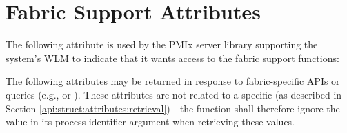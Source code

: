 
\begin{arglist}
\end{arglist}

\section{Fabric Support Attributes}
\label{api:fabric:attrs}

The following attribute is used by the \ac{PMIx} server library supporting the system's \ac{WLM} to indicate that it wants access to the fabric support functions:


\vspace{\baselineskip}
The following attributes may be returned in response to fabric-specific \acp{API} or queries (e.g.,  or ). These attributes are not related to a specific  (as described in Section \ref{api:struct:attributes:retrieval}) - the  function shall therefore ignore the value in its  process identifier argument when retrieving these values.

